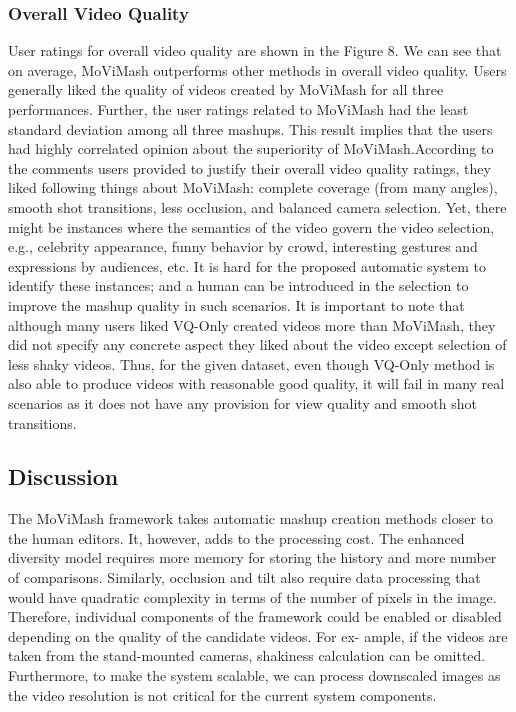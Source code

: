 \documentclass{sig-alternate}
\begin{document}
    \subsubsection{Overall Video Quality}
    User ratings for overall video quality are shown in the Figure 8. We can see that on average, MoViMash outperforms other methods in overall video quality. Users generally liked the quality of videos created by MoViMash for all three performances. Further, the user ratings related to MoViMash had the least standard deviation among all three mashups. This result implies that the users had highly correlated opinion about the superiority of MoViMash.According to the comments users provided to justify their overall video quality ratings, they liked following things about MoViMash: complete coverage (from many angles), smooth shot transitions, less occlusion, and balanced camera selection. Yet, there might be instances where the semantics of the video govern the video selection, e.g., celebrity appearance, funny behavior by crowd, interesting gestures and expressions by audiences, etc. It is hard for the proposed automatic system to identify these instances; and a human can be introduced in the selection to improve the mashup quality in such scenarios. It is important to note that although many users liked VQ-Only created videos more than MoViMash, they did not specify any concrete aspect they liked about the video except selection of less shaky videos. Thus, for the given dataset, even though VQ-Only method is also able to produce videos with reasonable good quality, it will fail in many real scenarios as it does not have any provision for view quality and smooth shot transitions.
    \subsection{Discussion}
    The MoViMash framework takes automatic mashup creation methods closer to the human editors. It, however, adds to the processing cost. The enhanced diversity model requires more memory for storing the history and more number of comparisons. Similarly, occlusion and tilt also require data processing that would have quadratic complexity in terms of the number of pixels in the image. Therefore, individual components of the framework could be enabled or disabled depending on the quality of the candidate videos. For ex- ample, if the videos are taken from the stand-mounted cameras, shakiness calculation can be omitted. Furthermore, to make the system scalable, we can process downscaled images as the video resolution is not critical for the current system components.
    
\end{document}
